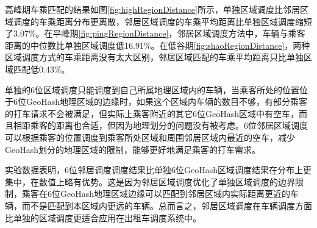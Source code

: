 




高峰期车乘匹配的结果如图\ref{fig:highRegionDistance}所示，单独区域调度比邻居区域调度的车乘距离分布更离散，邻居区域调度的车乘平均距离比单独区域调度缩短了3.07$\%$。在平峰期\ref{fig:pingRegionDistance}，邻居区域调度方法中，车辆与乘客距离的中位数比单独区域调度低16.91$\%$。在低谷期\ref{fig:shaoRegionDistance}，两种区域调度方式的车乘距离没有太大区别，邻居区域匹配的车乘平均距离只比单独区域匹配低0.43$\%$。

单独的6位区域调度只能调度到自己所属地理区域内的车辆，当乘客所处的位置位于6位GeoHash地理区域的边缘时，如果这个区域内车辆的数目不够，有部分乘客的打车请求不会被满足，但实际上乘客附近的其它6位GeoHash区域中有空车，而且相距乘客的距离也合适，但因为地理划分的问题没有被考虑。6位邻居区域调度可以根据乘客的位置调度到乘客所处区域和周围邻居区域内最近的空车，减少GeoHash划分的地理区域的限制，能够更好地满足乘客的打车需求。

实验数据表明，6位邻居调度调度结果比单独6位GeoHash区域调度结果在分布上更集中，在数值上略有优势。这是因为邻居区域调度优化了单独区域调度的边界限制，乘客在6位GeoHash地理区域边缘可以匹配到邻居区域内实际距离更近的车辆，而不是匹配到本区域内更远的车辆。总而言之，邻居区域调度在车辆调度方面比单独的区域调度更适合应用在出租车调度系统中。


